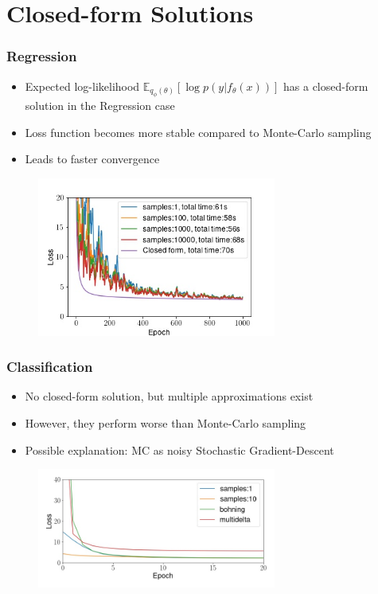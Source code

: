 \documentclass{beamer}
\begin{document}
        \section{Closed-form Solutions}
        \begin{frame}
            \frametitle{Regression}
            \begin{itemize}
                \item Expected log-likelihood $\mathbb{E}_{q_{\phi}(\theta)}[\log{p(y \vert f_{\theta}(x))}]$ has a closed-form solution in the Regression case
                \item Loss function becomes more stable compared to Monte-Carlo sampling
                \item Leads to faster convergence
            \end{itemize}
            \begin{figure}
                \includegraphics[width=0.7\textwidth]{images/Regression/CFvsMC.jpg}
            \end{figure}
        \end{frame}

        \begin{frame}
            \frametitle{Classification}
            \begin{itemize}
                \item No closed-form solution, but multiple approximations exist
                \item However, they perform worse than Monte-Carlo sampling
                \item Possible explanation: MC as noisy Stochastic Gradient-Descent
            \end{itemize}
            \begin{figure}
                \includegraphics[width=0.7\textwidth]{images/Classification/CFvsMC.jpg}
            \end{figure}
        \end{frame}
        
\end{document}
